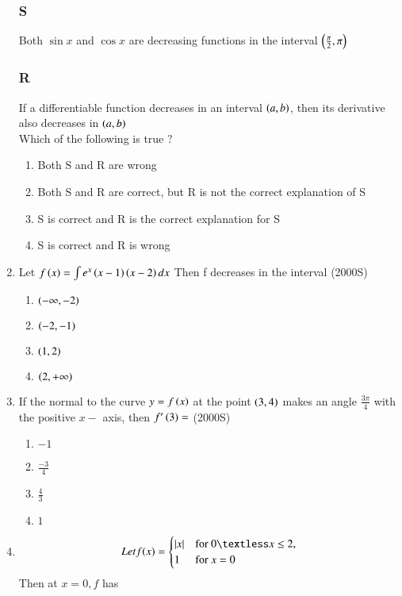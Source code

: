 \documentclass[journal,10pt,twocolumn]{IEEEtran}
\theoremstyle{remark}
\begin{document}
\begin{enumerate}[start=9]
\subsubsection*{S} Both $\sin x$ and $\cos x$ are decreasing functions in the interval $\left(\frac{\pi}{2},\pi\right)$
\subsubsection*{R} If a differentiable function decreases in an interval $\left(a,b\right)$, then its derivative also decreases in $\left(a,b\right)$\\
Which of the following is true $?$

\begin{enumerate}
    \item Both S and R are wrong
    \item Both S and R are correct, but R is not the correct explanation of S
    \item S is correct and R is the correct explanation for S
    \item S is correct and R is wrong
\end{enumerate}
\item Let $f\left(x\right)=\int{e^x\ensuremath{\left(x-1\right)}\ensuremath{\left(x-2\right)}dx}$ Then f decreases in the interval
\hfill {(2000S)} \\
\begin{enumerate}
    \item $\left(-\infty,-2\right)$
    \item $\left(-2,-1\right)$
    \item $\left(1,2\right)$
    \item $\left(2,+\infty\right)$
\end{enumerate}
\item If the normal to the curve $y=f\left(x\right)$ at the point $\left(3,4\right)$ makes an angle $\frac{3\pi}{4}$ with the positive $x-$ axis, then $f'\left(3\right)=$
\hfill {(2000S)} \\
\begin{enumerate}
    \item $-1$
    \item $\frac{-3}{4}$
    \item $\frac{4}{3}$
    \item $1$
\end{enumerate}
\item $$ Let f(x) = 
\begin{cases} 
\abs{x} & \text{for } 0 \textless x \leq 2, \\
1 & \text{for } x = 0 
\end{cases}
$$
Then at $x=0, f$ has 


\end{enumerate}
\end{document}
